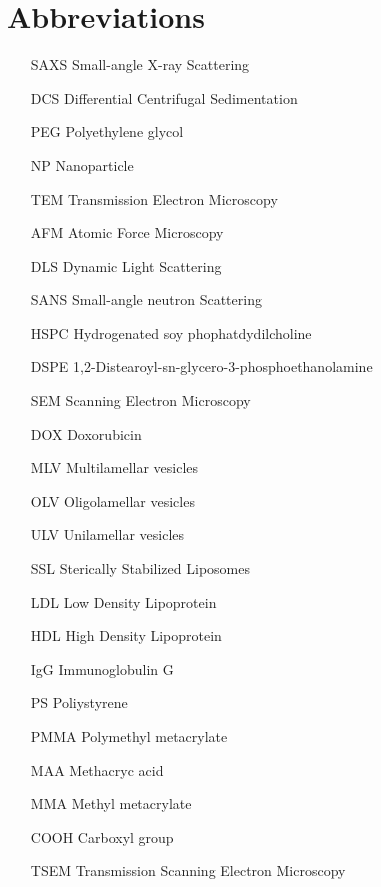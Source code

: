 \section*{Abbreviations}

\thispagestyle{empty}

\begin{itemize}
        \item   [SAXS] Small-angle X-ray Scattering
        \item   [DCS] Differential Centrifugal Sedimentation
        \item   [PEG] Polyethylene glycol
        \item   [NP] Nanoparticle
        \item   [TEM] Transmission Electron Microscopy
        \item   [AFM] Atomic Force Microscopy
        \item   [DLS] Dynamic Light Scattering
        \item   [SANS] Small-angle neutron Scattering
        \item   [HSPC] Hydrogenated soy phophatdydilcholine
        \item   [DSPE] 1,2-Distearoyl-sn-glycero-3-phosphoethanolamine
        \item   [SEM] Scanning Electron Microscopy
        \item   [DOX] Doxorubicin        
        \item   [MLV] Multilamellar vesicles
        \item   [OLV] Oligolamellar vesicles
        \item   [ULV] Unilamellar vesicles
        \item   [SSL] Sterically Stabilized Liposomes
        \item   [LDL] Low Density Lipoprotein
        \item   [HDL] High Density Lipoprotein
        \item   [IgG] Immunoglobulin G
        \item   [PS] Poliystyrene
        \item   [PMMA] Polymethyl metacrylate
        \item   [MAA] Methacryc acid
        \item   [MMA] Methyl metacrylate        
        \item   [COOH] Carboxyl group
        \item   [TSEM] Transmission Scanning Electron Microscopy
        

\end{itemize}
